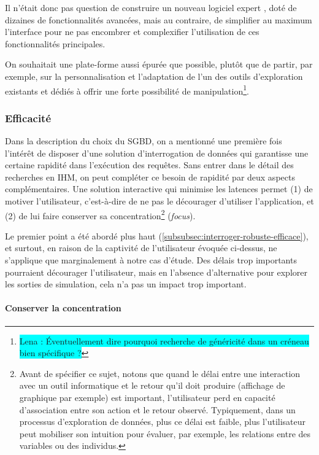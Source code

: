 Il n'était donc pas question de construire un nouveau \og logiciel expert \fg{}, doté de dizaines de fonctionnalités avancées, mais au contraire, de simplifier au maximum l'interface pour ne pas encombrer et complexifier l'utilisation de ces fonctionnalités principales.

On souhaitait une plate-forme aussi épurée que possible, plutôt que de partir, par exemple, sur la personnalisation et l'adaptation de l'un des outils d'exploration existants et dédiés à offrir une forte possibilité de manipulation\footnote{
\colorbox{Cyan}{Lena : \og Éventuellement dire pourquoi recherche de généricité dans un créneau bien spécifique ?}
}.


\subsubsection{Efficacité}

Dans la description du choix du SGBD, on a mentionné une première fois l'intérêt de disposer d'une solution d'interrogation de données qui garantisse une certaine rapidité dans l'exécution des requêtes.
Sans entrer dans le détail des recherches en IHM, on peut compléter ce besoin de rapidité par deux aspects complémentaires.
Une solution interactive qui minimise les latences permet (1) de motiver l'utilisateur, c'est-à-dire de ne pas le décourager d'utiliser l'application, et (2) de lui faire conserver sa concentration\footnote{
Avant de spécifier ce sujet, notons que quand le délai entre une interaction avec un outil informatique et le retour qu'il doit produire (affichage de graphique par exemple) est important, l'utilisateur perd en capacité d'association entre son action et le retour observé.
Typiquement, dans un processus d'exploration de données, plus ce délai est faible, plus l'utilisateur peut mobiliser son intuition pour évaluer, par exemple, les relations entre des variables ou des individus.
} (\textit{focus}).

Le premier point a été abordé plus haut (\cref{subsubsec:interroger-robuste-efficace}), et surtout, en raison de la \og captivité\fg{} de l'utilisateur évoquée ci-dessus, ne s'applique que marginalement à notre cas d'étude.
Des délais trop importants pourraient décourager l'utilisateur, mais en l'absence d'alternative pour explorer les sorties de simulation, cela n'a pas un impact trop important.

\paragraph*{Conserver la concentration}

